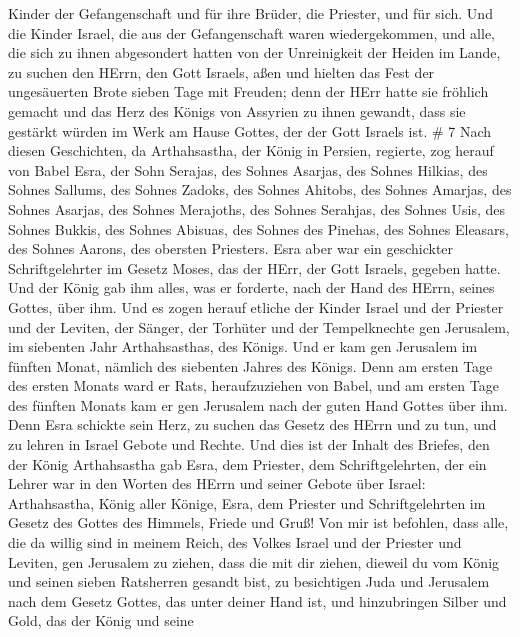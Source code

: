 Kinder der Gefangenschaft und für ihre Brüder, die Priester, und für
sich.  Und die Kinder Israel, die aus der Gefangenschaft
waren wiedergekommen, und alle, die sich zu ihnen abgesondert hatten von
der Unreinigkeit der Heiden im Lande, zu suchen den HErrn, den Gott
Israels, aßen  und hielten das Fest der ungesäuerten Brote
sieben Tage mit Freuden; denn der HErr hatte sie fröhlich gemacht und
das Herz des Königs von Assyrien zu ihnen gewandt, dass sie gestärkt
würden im Werk am Hause Gottes, der der Gott Israels ist. \# 7
 Nach diesen Geschichten, da Arthahsastha, der König in
Persien, regierte, zog herauf von Babel Esra, der Sohn Serajas, des
Sohnes Asarjas, des Sohnes Hilkias,  des Sohnes Sallums, des
Sohnes Zadoks, des Sohnes Ahitobs,  des Sohnes Amarjas, des
Sohnes Asarjas, des Sohnes Merajoths,  des Sohnes Serahjas,
des Sohnes Usis, des Sohnes Bukkis,  des Sohnes Abisuas, des
Sohnes des Pinehas, des Sohnes Eleasars, des Sohnes Aarons, des obersten
Priesters.  Esra aber war ein geschickter Schriftgelehrter
im Gesetz Moses, das der HErr, der Gott Israels, gegeben hatte. Und der
König gab ihm alles, was er forderte, nach der Hand des HErrn, seines
Gottes, über ihm.  Und es zogen herauf etliche der Kinder
Israel und der Priester und der Leviten, der Sänger, der Torhüter und
der Tempelknechte gen Jerusalem, im siebenten Jahr Arthahsasthas, des
Königs.  Und er kam gen Jerusalem im fünften Monat, nämlich
des siebenten Jahres des Königs.  Denn am ersten Tage des
ersten Monats ward er Rats, heraufzuziehen von Babel, und am ersten Tage
des fünften Monats kam er gen Jerusalem nach der guten Hand Gottes über
ihm.  Denn Esra schickte sein Herz, zu suchen das Gesetz
des HErrn und zu tun, und zu lehren in Israel Gebote und Rechte.
 Und dies ist der Inhalt des Briefes, den der König
Arthahsastha gab Esra, dem Priester, dem Schriftgelehrten, der ein
Lehrer war in den Worten des HErrn und seiner Gebote über Israel:
 Arthahsastha, König aller Könige, Esra, dem Priester und
Schriftgelehrten im Gesetz des Gottes des Himmels, Friede und Gruß!
 Von mir ist befohlen, dass alle, die da willig sind in
meinem Reich, des Volkes Israel und der Priester und Leviten, gen
Jerusalem zu ziehen, dass die mit dir ziehen,  dieweil du
vom König und seinen sieben Ratsherren gesandt bist, zu besichtigen Juda
und Jerusalem nach dem Gesetz Gottes, das unter deiner Hand ist,
 und hinzubringen Silber und Gold, das der König und seine
